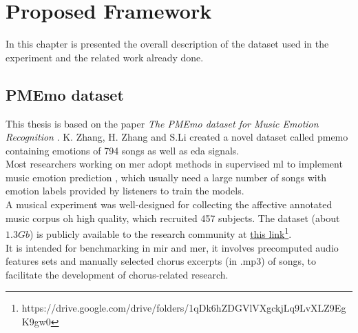 \chapter{Proposed Framework}
\label{chap:proposed_framework}
\pagestyle{plain}
\vspace{0.5cm}

\noindent In this chapter is presented the overall description of the dataset used in the experiment and the related work already done.

\section{PMEmo dataset}
This thesis is based on the paper \textit{The PMEmo dataset for Music Emotion Recognition} \cite{zhang2018pmemo}. K. Zhang, H. Zhang and S.Li created a novel dataset called \gls{pmemo} containing emotions of 794 songs as well as \gls{eda} signals.
\\ \indent
Most researchers working on \gls{mer} adopt methods in supervised \gls{ml} to implement music emotion prediction \cite{yang2012machine}, which usually need a large number of songs with emotion labels provided by listeners to train the models.
\\ \indent
A musical experiment was well-designed for collecting the affective annotated music corpus oh high quality, which recruited 457 subjects.
The dataset (about $1.3Gb$) is publicly available to the research community at \href{https://drive.google.com/drive/folders/1qDk6hZDGVlVXgckjLq9LvXLZ9EgK9gw0}{this link}\footnote{https://drive.google.com/drive/folders/1qDk6hZDGVlVXgckjLq9LvXLZ9EgK9gw0}.
\\
It is intended for benchmarking in \gls{mir} and \gls{mer}, it involves precomputed audio features sets and manually selected chorus excerpts (in .mp3) of songs, to facilitate the development of chorus-related research.

